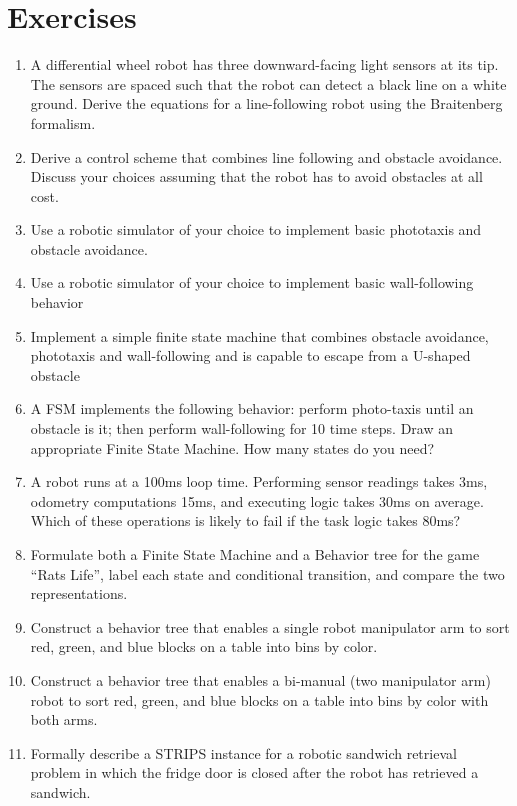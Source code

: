 \section*{Exercises}\small

\begin{enumerate}
\item A differential wheel robot has three downward-facing light sensors at its tip. The sensors are spaced such that the robot can detect a black line on a white ground. Derive the equations for a line-following robot using the Braitenberg formalism.
\item Derive a control scheme that combines line following and obstacle avoidance. Discuss your choices assuming that the robot has to avoid obstacles at all cost.
\item Use a robotic simulator of your choice to implement basic phototaxis and obstacle avoidance.
\item Use a robotic simulator of your choice to implement basic wall-following behavior
\item Implement a simple finite state machine that combines obstacle avoidance, phototaxis and wall-following and is capable to escape from a U-shaped obstacle
\item A FSM implements the following behavior: perform photo-taxis until an obstacle is it; then perform wall-following for 10 time steps. Draw an appropriate Finite State Machine. How many states do you need?
\item A robot runs at a 100ms loop time. Performing sensor readings takes 3ms, odometry computations 15ms, and executing logic takes 30ms on average. Which of these operations is likely to fail if the task logic takes 80ms?
\item Formulate both a Finite State Machine and a Behavior tree for the game ``Rats Life'', label each state and conditional transition, and compare the two representations.
\item Construct a behavior tree that enables a single robot manipulator arm to sort red, green, and blue blocks on a table into bins by color.
\item Construct a behavior tree that enables a bi-manual (two manipulator arm) robot to sort red, green, and blue blocks on a table into bins by color with both arms.
\item Formally describe a STRIPS instance for a robotic sandwich retrieval problem in which the fridge door is closed after the robot has retrieved a sandwich. 
\end{enumerate}\normalsize
